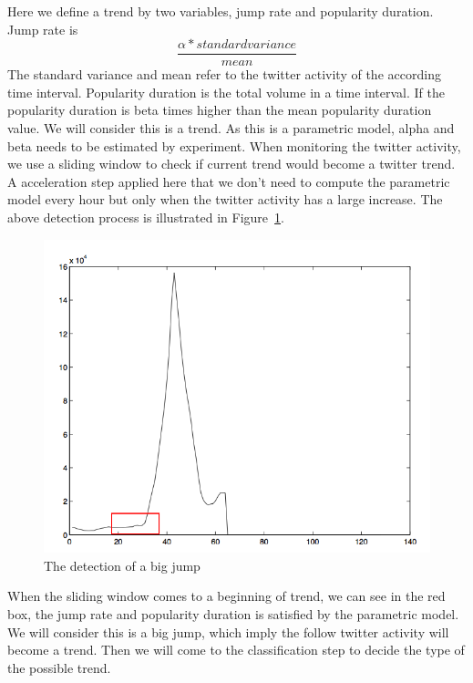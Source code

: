 \documentclass{article}
\begin{document}
Here we define a trend by two variables, jump rate and popularity duration. Jump rate is 
\begin{equation} 
\frac{\alpha * standard variance}{mean}
\end{equation}
The standard variance and mean refer to the twitter activity of the according time interval.
Popularity duration is the total volume in a time interval. If the popularity duration is beta times higher than the mean popularity duration value. We will consider this is a trend. As this is a parametric model, alpha and beta needs to be estimated by experiment. When monitoring the twitter activity, we use a sliding window to check if current trend would become a twitter trend. A acceleration step applied here that we don't need to compute the parametric model every hour but only when the twitter activity has a large increase. 
The above detection process is illustrated in Figure~\ref{imgjump}.
\begin{figure}[ht]
\vskip 0.2in
\begin{center}
\centerline{\includegraphics[width=\columnwidth]{jump}}
\caption{The detection of a big jump}
\label{imgjump}
\end{center}
\vskip -0.2in
\end{figure} 
When the sliding window comes  to a beginning of trend, we can see in the red box, the jump rate and popularity duration is satisfied by the parametric model. We will consider this is a big jump, which imply the follow twitter activity will become a trend. Then we will come to the classification step to decide the type of the possible trend.
\end{document}
